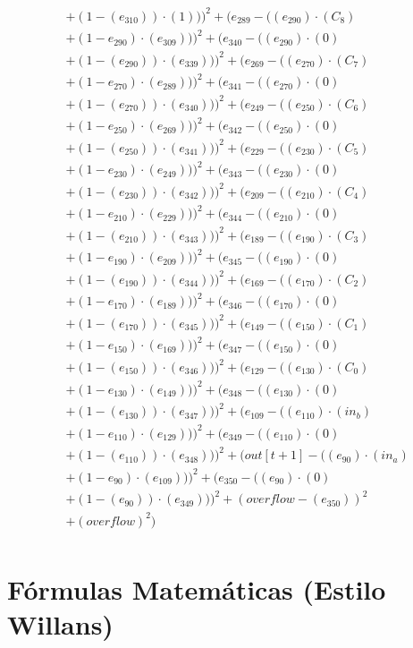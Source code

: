 \documentclass[10pt, a4paper]{article}
\begin{document}
\begin{small}
\begin{align*}
& + (1 - (e_{310})) \cdot (1)))^{2} + (e_{289} - ((e_{290})  \cdot  (C_{8}) \\
& + (1 - e_{290})  \cdot  (e_{309})))^{2} + (e_{340} - ((e_{290}) \cdot (0) \\
& + (1 - (e_{290})) \cdot (e_{339})))^{2} + (e_{269} - ((e_{270})  \cdot  (C_{7}) \\
& + (1 - e_{270})  \cdot  (e_{289})))^{2} + (e_{341} - ((e_{270}) \cdot (0) \\
& + (1 - (e_{270})) \cdot (e_{340})))^{2} + (e_{249} - ((e_{250})  \cdot  (C_{6}) \\
& + (1 - e_{250})  \cdot  (e_{269})))^{2} + (e_{342} - ((e_{250}) \cdot (0) \\
& + (1 - (e_{250})) \cdot (e_{341})))^{2} + (e_{229} - ((e_{230})  \cdot  (C_{5}) \\
& + (1 - e_{230})  \cdot  (e_{249})))^{2} + (e_{343} - ((e_{230}) \cdot (0) \\
& + (1 - (e_{230})) \cdot (e_{342})))^{2} + (e_{209} - ((e_{210})  \cdot  (C_{4}) \\
& + (1 - e_{210})  \cdot  (e_{229})))^{2} + (e_{344} - ((e_{210}) \cdot (0) \\
& + (1 - (e_{210})) \cdot (e_{343})))^{2} + (e_{189} - ((e_{190})  \cdot  (C_{3}) \\
& + (1 - e_{190})  \cdot  (e_{209})))^{2} + (e_{345} - ((e_{190}) \cdot (0) \\
& + (1 - (e_{190})) \cdot (e_{344})))^{2} + (e_{169} - ((e_{170})  \cdot  (C_{2}) \\
& + (1 - e_{170})  \cdot  (e_{189})))^{2} + (e_{346} - ((e_{170}) \cdot (0) \\
& + (1 - (e_{170})) \cdot (e_{345})))^{2} + (e_{149} - ((e_{150})  \cdot  (C_{1}) \\
& + (1 - e_{150})  \cdot  (e_{169})))^{2} + (e_{347} - ((e_{150}) \cdot (0) \\
& + (1 - (e_{150})) \cdot (e_{346})))^{2} + (e_{129} - ((e_{130})  \cdot  (C_{0}) \\
& + (1 - e_{130})  \cdot  (e_{149})))^{2} + (e_{348} - ((e_{130}) \cdot (0) \\
& + (1 - (e_{130})) \cdot (e_{347})))^{2} + (e_{109} - ((e_{110})  \cdot  (in_b) \\
& + (1 - e_{110})  \cdot  (e_{129})))^{2} + (e_{349} - ((e_{110}) \cdot (0) \\
& + (1 - (e_{110})) \cdot (e_{348})))^{2} + (out[t+1] - ((e_{90})  \cdot  (in_a) \\
& + (1 - e_{90})  \cdot  (e_{109})))^{2} + (e_{350} - ((e_{90}) \cdot (0) \\
& + (1 - (e_{90})) \cdot (e_{349})))^{2} + (overflow - (e_{350}))^{2} \\
& + (overflow)^{2}) \\
\end{align*}
\end{small}\part{Fórmulas Matemáticas (Estilo Willans)}
\end{document}

